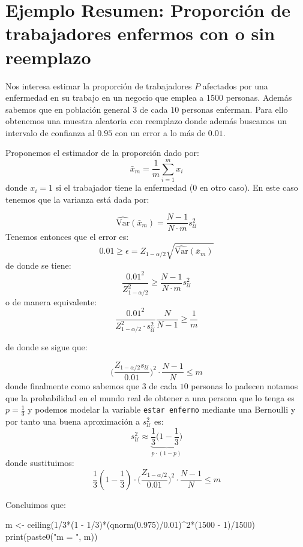 \documentclass[
]{book}
\newenvironment{Shaded}{\begin{snugshade}}{\end{snugshade}}
\newcommand{\DecValTok}[1]{\textcolor[rgb]{0.00,0.00,0.81}{#1}}
\newcommand{\FloatTok}[1]{\textcolor[rgb]{0.00,0.00,0.81}{#1}}
\newcommand{\FunctionTok}[1]{\textcolor[rgb]{0.00,0.00,0.00}{#1}}
\newcommand{\NormalTok}[1]{#1}
\newcommand{\OtherTok}[1]{\textcolor[rgb]{0.56,0.35,0.01}{#1}}
\newcommand{\SpecialCharTok}[1]{\textcolor[rgb]{0.00,0.00,0.00}{#1}}
\newcommand{\StringTok}[1]{\textcolor[rgb]{0.31,0.60,0.02}{#1}}
\begin{document}
\hypertarget{ejemplo-resumen-proporciuxf3n-de-trabajadores-enfermos-con-o-sin-reemplazo}{%
\section{Ejemplo Resumen: Proporción de trabajadores enfermos con o sin reemplazo}\label{ejemplo-resumen-proporciuxf3n-de-trabajadores-enfermos-con-o-sin-reemplazo}}

Nos interesa estimar la proporción de trabajadores \(P\) afectados por una enfermedad en su trabajo en un negocio que emplea a 1500 personas. Además sabemos que en población general \(3\) de cada \(10\) personas enferman. Para ello obtenemos una muestra aleatoria con reemplazo donde además buscamos un intervalo de confianza al \(0.95\) con un error a lo más de \(0.01\).

Proponemos el estimador de la proporción dado por:
\[
\bar{x}_m = \frac{1}{m}\sum\limits_{i = 1}^m x_i
\]
donde \(x_i = 1\) si el trabajador tiene la enfermedad (\(0\) en otro caso). En este caso tenemos que la varianza está dada por:

\[
\widehat{\text{Var}}(\bar{x}_m) =\frac{N-1}{N\cdot m} s^2_{\mathcal{U}}
\]
Tenemos entonces que el error es:
\[
0.01 \geq \epsilon = Z_{1 - \alpha/2} \sqrt{\widehat{\text{Var}}(\bar{x}_m)}
\]
de donde se tiene:
\[
\dfrac{0.01^2}{Z_{1 - \alpha/2}^2} \geq  \frac{N-1}{N\cdot m} s^2_{\mathcal{U}}
\]
o de manera equivalente:
\[
\dfrac{0.01^2}{Z_{1 - \alpha/2}^2\cdot s^2_{\mathcal{U}}}\dfrac{N}{N-1} \geq \frac{1}{m} 
\]

de donde se sigue que:

\[
\Big(\dfrac{Z_{1 - \alpha/2}s_{\mathcal{U}}}{0.01}\Big)^2\cdot \dfrac{N-1}{N} \leq  m
\]
donde finalmente como sabemos que \(3\) de cada \(10\) personas lo padecen notamos que la probabilidad en el mundo real de obtener a una persona que lo tenga es \(p = \frac{1}{3}\) y podemos modelar la variable \texttt{estar\ enfermo} mediante una Bernoulli y por tanto una buena aproximación a \(s^2_{\mathcal{U}}\) es:
\[
s^2_{\mathcal{U}} \approx \underbrace{\frac{1}{3}\Big( 1 - \frac{1}{3}\Big)}_{p\cdot(1-p)}
\]
donde sustituimos:
\[
\frac{1}{3}(1 - \frac{1}{3})\cdot \Bigg(\dfrac{Z_{1 - \alpha/2}}{0.01}\Bigg)^2\cdot \dfrac{N-1}{N} \leq  m
\]

Concluimos que:

\begin{Shaded}
\begin{Highlighting}[]
\NormalTok{m }\OtherTok{\textless{}{-}} \FunctionTok{ceiling}\NormalTok{(}\DecValTok{1}\SpecialCharTok{/}\DecValTok{3}\SpecialCharTok{*}\NormalTok{(}\DecValTok{1} \SpecialCharTok{{-}} \DecValTok{1}\SpecialCharTok{/}\DecValTok{3}\NormalTok{)}\SpecialCharTok{*}\NormalTok{(}\FunctionTok{qnorm}\NormalTok{(}\FloatTok{0.975}\NormalTok{)}\SpecialCharTok{/}\FloatTok{0.01}\NormalTok{)}\SpecialCharTok{\^{}}\DecValTok{2}\SpecialCharTok{*}\NormalTok{(}\DecValTok{1500} \SpecialCharTok{{-}} \DecValTok{1}\NormalTok{)}\SpecialCharTok{/}\DecValTok{1500}\NormalTok{)}
\FunctionTok{print}\NormalTok{(}\FunctionTok{paste0}\NormalTok{(}\StringTok{"m = "}\NormalTok{, m))}
\end{Highlighting}
\end{Shaded}
\end{document}
